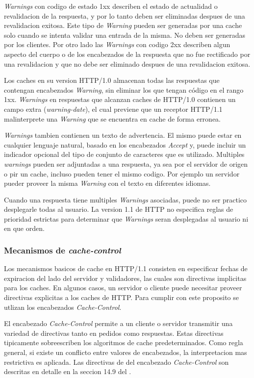 \emph{Warnings} con codigo de estado 1xx describen el estado de actualidad o revalidacion de la respuesta, y por lo tanto deben ser eliminadas despues de una revalidacion
exitosa. Este tipo de \emph{Warning} pueden ser generadas por una cache solo cuando se intenta validar una entrada de la misma. No deben ser generadas por los clientes.
Por otro lado las \emph{Warnings} con codigo 2xx describen algun aspecto del cuerpo o de los encabezados de la respuesta que no fue rectificado por una revalidacion y que no
debe ser eliminado despues de una revalidacion exitosa.

Los caches en su version HTTP/1.0 almacenan todas las respuestas que contengan encabezados \emph{Warning}, sin eliminar los que tengan código en el rango 1xx. \emph{Warnings} en respuestas
que alcanzan caches de HTTP/1.0 contienen un campo extra (\emph{warning-date}), el cual previene que un receptor HTTP/1.1 malinterprete una \emph{Warning} que se encuentra en
cache de forma erronea.

\emph{Warnings} tambien contienen un texto de advertencia. El mismo puede estar en cualquier lenguaje natural, basado en los encabezados \emph{Accept} y, puede incluir un
indicador opcional del tipo de conjunto de caracteres que es utilizado. Multiples \emph{warnings} pueden ser adjuntadas a una respuesta, ya sea por el servidor de origen o
pir un cache, incluso pueden tener el mismo codigo. Por ejemplo un servidor pueder proveer la misma \emph{Warning} con el texto en diferentes idiomas.

Cuando una respuesta tiene multiples \emph{Warnings} asociadas, puede no ser practico desplegarle todas al usuario. La version 1.1 de HTTP no especifica reglas de prioridad
estrictas para determinar que \emph{Warnings} seran desplegadas al usuario ni en que orden.

\subsubsection{Mecanismos de \emph{cache-control}}

Los mecanismos basicos de cache en HTTP/1.1 consisten en especificar fechas de expiracion del lado del servidor y validadores, las cuales son directivas implicitas
para los caches. En algunos casos, un servidor o cliente puede necesitar proveer directivas explicitas a los caches de HTTP.
Para cumplir con este proposito se utlizan los encabezados \emph{Cache-Control}.

El encabezado \emph{Cache-Control} permite a un cliente o servidor transmitir una variedad de directivas tanto en pedidos como respuestas. Estas directivas tipicamente
sobreescriben los algoritmos de cache predeterminados. Como regla general, si existe un conflicto entre valores de encabezados, la interpretacion mas restrictiva es
aplicada. Las directivas de del encabezado \emph{Cache-Control} son descritas en detalle en la seccion 14.9 del \cite{rfc2616}.

